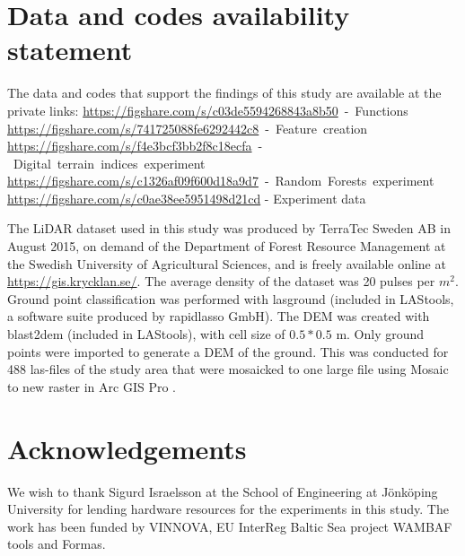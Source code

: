 \documentclass[]{interact}
\theoremstyle{plain}%
\theoremstyle{definition}
\theoremstyle{remark}
\begin{document}
\section*{Data and codes availability statement}
The data and codes that support the findings of this study are available at the private links:\newline
\mbox{\href{https://figshare.com/s/c03de5594268843a8b50}{https://figshare.com/s/c03de5594268843a8b50} - Functions\itshape\ignorespaces}
\mbox{\href{https://figshare.com/s/741725088fe6292442c8}{https://figshare.com/s/741725088fe6292442c8} - Feature creation\itshape\ignorespaces}
\mbox{\href{https://figshare.com/s/f4e3bcf3bb2f8c18ecfa}{https://figshare.com/s/f4e3bcf3bb2f8c18ecfa} - Digital terrain indices experiment\itshape\ignorespaces}
\mbox{\href{https://figshare.com/s/c1326af09f600d18a9d7}{https://figshare.com/s/c1326af09f600d18a9d7} - Random Forests experiment\itshape\ignorespaces}
\mbox{\href{https://figshare.com/s/c0ae38ee5951498d21cd}{https://figshare.com/s/c0ae38ee5951498d21cd}} - Experiment data

\label{lidartodem}
The LiDAR dataset used in this study was produced by TerraTec Sweden AB in August 2015, on demand of the Department of Forest Resource Management at the Swedish University of Agricultural Sciences, and is freely available online at \href{https://gis.krycklan.se/}{https://gis.krycklan.se/}. The average density of the dataset was 20 pulses per $m^2$.  Ground point classification was performed with lasground (included in LAStools, a software suite produced by rapidlasso GmbH). The DEM was created with blast2dem (included in LAStools),  with cell size of $0.5*0.5$ m. Only ground points were imported  to generate a DEM of the ground. This was conducted for 488 las-files of the study area that were mosaicked to one large file using Mosaic to new raster in Arc GIS Pro \citep{EsriArcGisBook}.

\section*{Acknowledgements}
We wish to thank Sigurd Israelsson at the School of Engineering at J\"onk\"oping University for lending hardware resources for the experiments in this study. The work has been funded by VINNOVA, EU InterReg Baltic Sea project WAMBAF tools and Formas.



\label{references}



\end{document}
